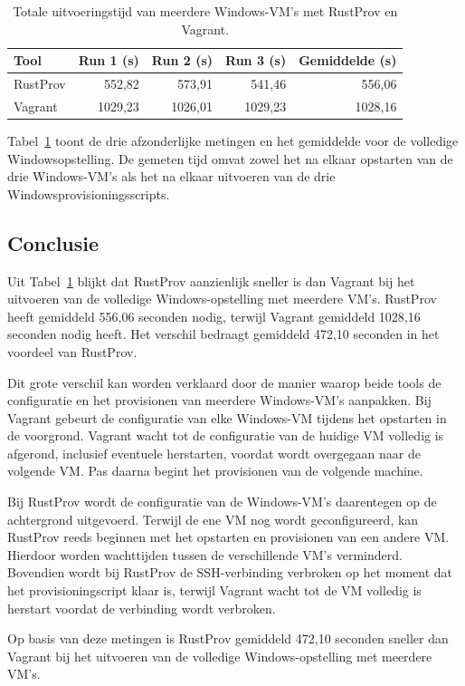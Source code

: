 \begin{table}[htbp]
    \centering
    \caption{Totale uitvoeringstijd van meerdere Windows-VM's met RustProv en Vagrant.}
    \label{tab:meting-meerdere-windows}
    \begin{tabular}{lrrrr}
        \toprule
        \textbf{Tool} &
        \textbf{Run 1 (s)} &
        \textbf{Run 2 (s)} &
        \textbf{Run 3 (s)} &
        \textbf{Gemiddelde (s)} \\
        \midrule
        RustProv & 552,82 & 573,91 & 541,46 & 556,06 \\
        Vagrant  & 1029,23 & 1026,01 & 1029,23 & 1028,16 \\
        \bottomrule
    \end{tabular}
\end{table}

Tabel~\ref{tab:meting-meerdere-windows} toont de drie afzonderlijke metingen en
het gemiddelde voor de volledige Windowsopstelling. De gemeten tijd omvat zowel
het na elkaar opstarten van de drie Windows-VM's als het na elkaar uitvoeren van
de drie Windowsprovisioningsscripts.


\subsection{Conclusie}

Uit Tabel~\ref{tab:meting-meerdere-windows} blijkt dat RustProv aanzienlijk
sneller is dan Vagrant bij het uitvoeren van de volledige Windows-opstelling met
meerdere VM's. RustProv heeft gemiddeld 556,06 seconden nodig, terwijl Vagrant
gemiddeld 1028,16 seconden nodig heeft. Het verschil bedraagt gemiddeld
472,10 seconden in het voordeel van RustProv.

Dit grote verschil kan worden verklaard door de manier waarop beide tools de
configuratie en het provisionen van meerdere Windows-VM's aanpakken. Bij Vagrant
gebeurt de configuratie van elke Windows-VM tijdens het opstarten in de
voorgrond. Vagrant wacht tot de configuratie van de huidige VM volledig is
afgerond, inclusief eventuele herstarten, voordat wordt overgegaan naar de
volgende VM. Pas daarna begint het provisionen van de volgende machine.

Bij RustProv wordt de configuratie van de Windows-VM's daarentegen op de
achtergrond uitgevoerd. Terwijl de ene VM nog wordt geconfigureerd, kan RustProv
reeds beginnen met het opstarten en provisionen van een andere VM. Hierdoor
worden wachttijden tussen de verschillende VM's verminderd. Bovendien wordt bij
RustProv de SSH-verbinding verbroken op het moment dat het provisioningscript
klaar is, terwijl Vagrant wacht tot de VM volledig is herstart voordat de
verbinding wordt verbroken.

Op basis van deze metingen is RustProv gemiddeld 472,10 seconden sneller dan
Vagrant bij het uitvoeren van de volledige Windows-opstelling met meerdere VM's.
